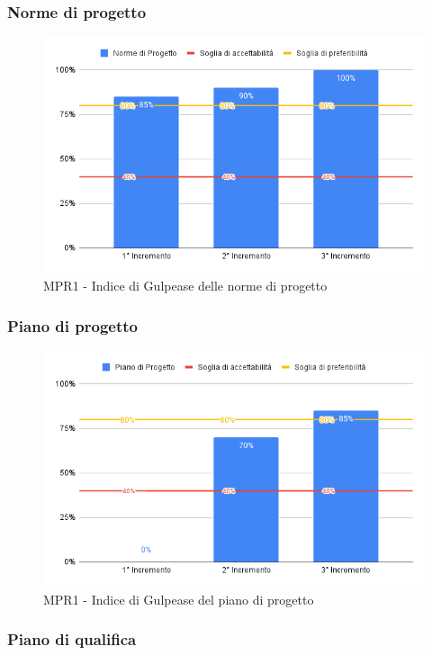 \subsubsection{Norme di progetto}

\begin{figure}[H]
	\centering
	\includegraphics[scale = 0.6]{sezioni/Images/NdP.png}
	\caption{MPR1 - Indice di Gulpease delle norme di progetto}
\end{figure}

\subsubsection{Piano di progetto}

\begin{figure}[H]
	\centering
	\includegraphics[scale = 0.6]{sezioni/Images/PdP.png}
	\caption{MPR1 - Indice di Gulpease del piano di progetto}
\end{figure}

\subsubsection{Piano di qualifica}

